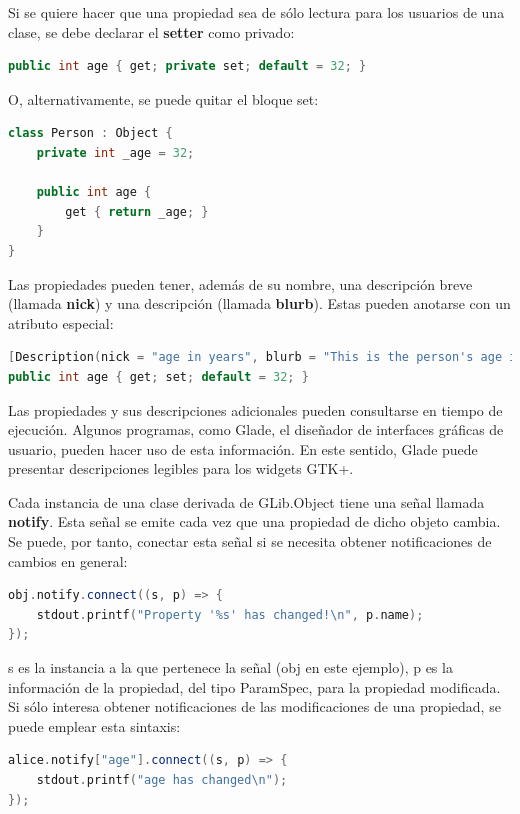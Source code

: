 \documentclass[12pt,twoside]{book}
\begin{document}
Si se quiere hacer que una propiedad sea de sólo lectura para los usuarios de una clase, se debe declarar el \textbf{setter} como privado:

\begin{lstlisting}[language=C++]
public int age { get; private set; default = 32; }
\end{lstlisting}

O, alternativamente, se puede quitar el bloque set:

\begin{lstlisting}[language=C++]
class Person : Object {
	private int _age = 32;
	
	public int age {
		get { return _age; }
	}
}
\end{lstlisting}


Las propiedades pueden tener, además de su nombre, una descripción breve (llamada \textbf{nick}) y una descripción (llamada \textbf{blurb}). Estas pueden anotarse con un atributo especial:

\begin{lstlisting}[language=C++]
[Description(nick = "age in years", blurb = "This is the person's age in years")]
public int age { get; set; default = 32; }
\end{lstlisting}


Las propiedades y sus descripciones adicionales pueden consultarse en tiempo de ejecución. Algunos programas, como Glade, el diseñador de interfaces gráficas de usuario, pueden hacer uso de esta información. En este sentido, Glade puede presentar descripciones legibles para los widgets GTK+.

Cada instancia de una clase derivada de GLib.Object tiene una señal llamada \textbf{notify}. Esta señal se emite cada vez que una propiedad de dicho objeto cambia. Se puede, por tanto, conectar esta señal si se necesita obtener notificaciones de cambios en general:

\begin{lstlisting}[language=C++]
obj.notify.connect((s, p) => {
	stdout.printf("Property '%s' has changed!\n", p.name);
});
\end{lstlisting}

s es la instancia a la que pertenece la señal (obj en este ejemplo), p es la información de la propiedad, del tipo ParamSpec, para la propiedad modificada. Si sólo interesa obtener notificaciones de las modificaciones de una propiedad, se puede emplear esta sintaxis:

\begin{lstlisting}[language=C++]
alice.notify["age"].connect((s, p) => {
	stdout.printf("age has changed\n");
});
\end{lstlisting}
\end{document}
